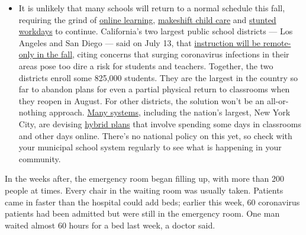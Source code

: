 \begin{itemize}
  \begin{itemize}
  \tightlist
  \item
    It is unlikely that many schools will return to a normal schedule
    this fall, requiring the grind of
    \href{https://www.nytimes3xbfgragh.onion/2020/06/05/us/coronavirus-education-lost-learning.html?action=click\&pgtype=Article\&state=default\&region=MAIN_CONTENT_3\&context=storylines_faq}{online
    learning},
    \href{https://www.nytimes3xbfgragh.onion/2020/05/29/us/coronavirus-child-care-centers.html?action=click\&pgtype=Article\&state=default\&region=MAIN_CONTENT_3\&context=storylines_faq}{makeshift
    child care} and
    \href{https://www.nytimes3xbfgragh.onion/2020/06/03/business/economy/coronavirus-working-women.html?action=click\&pgtype=Article\&state=default\&region=MAIN_CONTENT_3\&context=storylines_faq}{stunted
    workdays} to continue. California's two largest public school
    districts --- Los Angeles and San Diego --- said on July 13, that
    \href{https://www.nytimes3xbfgragh.onion/2020/07/13/us/lausd-san-diego-school-reopening.html?action=click\&pgtype=Article\&state=default\&region=MAIN_CONTENT_3\&context=storylines_faq}{instruction
    will be remote-only in the fall}, citing concerns that surging
    coronavirus infections in their areas pose too dire a risk for
    students and teachers. Together, the two districts enroll some
    825,000 students. They are the largest in the country so far to
    abandon plans for even a partial physical return to classrooms when
    they reopen in August. For other districts, the solution won't be an
    all-or-nothing approach.
    \href{https://bioethics.jhu.edu/research-and-outreach/projects/eschool-initiative/school-policy-tracker/}{Many
    systems}, including the nation's largest, New York City, are
    devising
    \href{https://www.nytimes3xbfgragh.onion/2020/06/26/us/coronavirus-schools-reopen-fall.html?action=click\&pgtype=Article\&state=default\&region=MAIN_CONTENT_3\&context=storylines_faq}{hybrid
    plans} that involve spending some days in classrooms and other days
    online. There's no national policy on this yet, so check with your
    municipal school system regularly to see what is happening in your
    community.
  \end{itemize}
\end{itemize}

In the weeks after, the emergency room began filling up, with more than
200 people at times. Every chair in the waiting room was usually taken.
Patients came in faster than the hospital could add beds; earlier this
week, 60 coronavirus patients had been admitted but were still in the
emergency room. One man waited almost 60 hours for a bed last week, a
doctor said.

